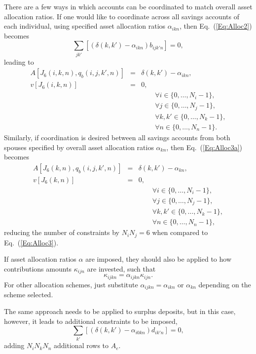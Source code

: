 \documentclass{article}[fleqn,12pt]
\begin{document}
There are a few ways in which accounts can be coordinated to match
overall asset allocation ratios.
If one would like to coordinate across all savings accounts of each individual,
using specified asset allocation ratios $\alpha_{ikn}$,
then Eq.~(\ref{Eq:Alloc2}) becomes
\begin{equation}
	\label{Eq:Alloc2a}
	\sum_{jk'} [(\delta(k, k') - \alpha_{ikn}) b_{ijk'n}] = 0,
\end{equation}
leading to
\begin{eqnarray}
	\label{Eq:Alloc3a}
	A[J_6(i, k, n), q_b(i, j, k', n)] &=& \delta(k, k') - \alpha_{ikn}, \nonumber\\
	v[J_6(i, k, n)] &=& 0, \\
	&&\qquad\forall i \in \{0,\ldots, N_i-1\},\nonumber\\
	&&\qquad\forall j \in \{0,\ldots, N_j-1\},\nonumber\\
	&&\qquad\forall k,k' \in \{0,\ldots, N_k-1\},\nonumber\\
	&&\qquad\forall n \in \{0,\ldots, N_n-1\}. \nonumber
\end{eqnarray}
Similarly, if coordination is desired between all savings accounts from both spouses
specified by overall asset allocation ratios $\alpha_{kn}$,
then Eq.~(\ref{Eq:Alloc3a}) becomes
\begin{eqnarray}
	\label{Eq:Alloc3b}
	A[J_6(k, n), q_b(i, j, k', n)] &=& \delta(k, k') - \alpha_{kn}, \nonumber\\
	v[J_6(k, n)] &=& 0, \\
	&&\qquad\forall i \in \{0,\ldots, N_i-1\},\nonumber\\
	&&\qquad\forall j \in \{0,\ldots, N_j-1\},\nonumber\\
	&&\qquad\forall k,k' \in \{0,\ldots, N_k-1\},\nonumber\\
	&&\qquad\forall n \in \{0,\ldots, N_n-1\}, \nonumber
\end{eqnarray}
reducing the number of constraints by $N_iN_j=6$ when compared to Eq.~(\ref{Eq:Alloc3}).

If asset allocation ratios $\alpha$ are imposed,
they should also be applied to how
contributions amounts $\kappa_{ijn}$ are invested, such that 
\begin{equation}
	\kappa_{ijkn} = \alpha_{ijkn} \kappa_{ijn}.
\end{equation}
For other allocation schemes, just substitute $\alpha_{ijkn} = \alpha_{ikn}$ or $\alpha_{kn}$
depending on the scheme selected.

The same approach needs to be applied to surplus deposits, but
in this case, however, it leads to
additional constraints to be imposed,
\begin{equation}
	\sum_{k'} [(\delta(k, k') - \alpha_{i0kn}) d_{ik'n}] = 0,
\end{equation}
adding $N_iN_kN_n$ additional rows to $A_e$.
\end{document}
